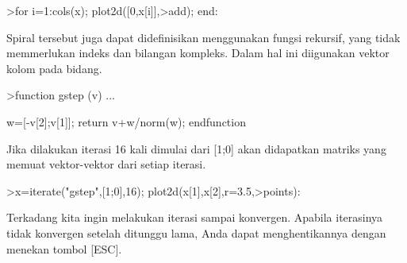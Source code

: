 \documentclass[12pt,arial,letterpaper]{book}
\begin{document}
\begin{eulernootebook}
\begin{eulercomment}
\begin{eulercomment}
\begin{eulernootebook}
\begin{eulercomment}
\begin{eulercomment}
\begin{eulercomment}
\begin{eulercomment}
\begin{eulercomment}
\begin{eulercomment}
\begin{eulernotebook}
\begin{eulercomment}
\begin{eulercomment}
\begin{eulercomment}
\begin{eulercomment}
\begin{eulercomment}
\begin{eulercomment}
\begin{eulercomment}
\begin{eulercomment}
\begin{eulercomment}
\begin{eulercomment}
\begin{eulercomment}
\begin{eulercomment}
\begin{eulercomment}
\begin{eulercomment}
\begin{eulercomment}
\begin{eulercomment}
\begin{eulercomment}
\begin{eulercomment}
\begin{eulercomment}
\begin{eulercomment}
\begin{eulercomment}
\begin{eulercomment}
\begin{eulercomment}
\begin{eulercomment}
\begin{eulercomment}
\begin{eulercomment}
\begin{eulercomment}
\begin{eulercomment}
\begin{eulerprompt}
>for i=1:cols(x); plot2d([0,x[i]],>add); end:
\end{eulerprompt}
\begin{eulercomment}
Spiral tersebut juga dapat didefinisikan menggunakan fungsi rekursif,
yang tidak memmerlukan indeks dan bilangan kompleks. Dalam hal ini
diigunakan vektor kolom pada bidang.
\end{eulercomment}
\begin{eulerprompt}
>function gstep (v) ...
\end{eulerprompt}
\begin{eulerudf}
  w=[-v[2];v[1]];
  return v+w/norm(w);
  endfunction
\end{eulerudf}
\begin{eulercomment}
Jika dilakukan iterasi 16 kali dimulai dari [1;0] akan didapatkan
matriks yang memuat vektor-vektor dari setiap iterasi.
\end{eulercomment}
\begin{eulerprompt}
>x=iterate("gstep",[1;0],16); plot2d(x[1],x[2],r=3.5,>points):
\end{eulerprompt}
\begin{eulercomment}
\begin{eulercomment}
\begin{eulercomment}
Terkadang kita ingin melakukan iterasi sampai konvergen. Apabila
iterasinya tidak konvergen setelah ditunggu lama, Anda dapat
menghentikannya dengan menekan tombol [ESC].

\end{eulercomment}
\end{eulercomment}
\end{eulercomment}
\end{eulercomment}
\end{eulercomment}
\end{eulercomment}
\end{eulercomment}
\end{eulercomment}
\end{eulercomment}
\end{eulercomment}
\end{eulercomment}
\end{eulercomment}
\end{eulercomment}
\end{eulercomment}
\end{eulercomment}
\end{eulercomment}
\end{eulercomment}
\end{eulercomment}
\end{eulercomment}
\end{eulercomment}
\end{eulercomment}
\end{eulercomment}
\end{eulercomment}
\end{eulercomment}
\end{eulercomment}
\end{eulercomment}
\end{eulercomment}
\end{eulercomment}
\end{eulercomment}
\end{eulercomment}
\end{eulercomment}
\end{eulernotebook}
\end{eulercomment}
\end{eulercomment}
\end{eulercomment}
\end{eulercomment}
\end{eulercomment}
\end{eulercomment}
\end{eulernootebook}
\end{eulercomment}
\end{eulercomment}
\end{eulernootebook}
\end{document}
